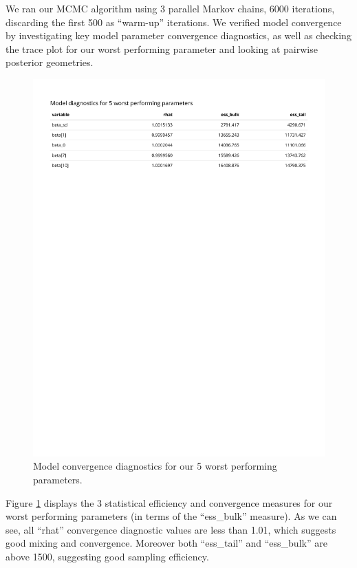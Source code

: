 \documentclass[
]{article}
\begin{document}
We ran our MCMC algorithm using 3 parallel Markov chains, 6000 iterations, discarding the first 500 as ``warm-up'' iterations. We verified model convergence by investigating key model parameter convergence diagnostics, as well as checking the trace plot for our worst performing parameter and looking at pairwise posterior geometries.

\begin{figure}

{\centering \includegraphics[width=1\linewidth]{../outputs/bayesian-analysis-country-freq/country-model-diagnostics} 

}

\caption{Model convergence diagnostics for our 5 worst performing parameters.}\label{fig:figs14}
\end{figure}

Figure \ref{fig:figs14} displays the 3 statistical efficiency and convergence measures for our worst performing parameters (in terms of the ``ess\_bulk'' measure). As we can see, all ``rhat'' convergence diagnostic values are less than 1.01, which suggests good mixing and convergence. Moreover both ``ess\_tail'' and ``ess\_bulk'' are above 1500, suggesting good sampling efficiency.
\end{document}

